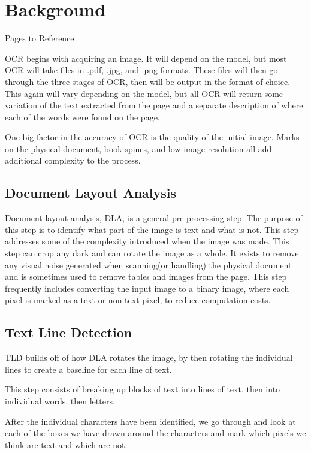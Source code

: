 \documentclass[sigplan,screen,nonacm]{acmart-tagged}
\begin{document}
\section{Background}
\label{sec:background}

Pages to Reference\cite{Raj:2022,Avyodri:2022,Thorat:2022}

OCR begins with acquiring an image. It will depend on the model, but most OCR will take files in .pdf, .jpg, and .png formats. These files will then go through the three stages of OCR, then will be output in the format of choice. This again will vary depending on the model, but all OCR will return some variation of the text extracted from the page and a separate description of where each of the words were found on the page.

One big factor in the accuracy of OCR is the quality of the initial image. Marks on the physical document, book spines, and low image resolution all add additional complexity to the process. 

\subsection{Document Layout Analysis}
\label{DLA}

Document layout analysis, DLA, is a general pre-processing step. The purpose of this step is to identify what part of the image is text and what is not. This step addresses some of the complexity introduced when the image was made. This step can crop any dark and can rotate the image as a whole. It exists to remove any visual noise generated when scanning(or handling) the physical document and is sometimes used to remove tables and images from the page. This step frequently includes converting the input image to a binary image, where each pixel is marked as a text or non-text pixel, to reduce computation costs.

\subsection{Text Line Detection}
\label{TLD}

TLD builds off of how DLA rotates the image, by then rotating the individual lines to create a baseline for each line of text. 

This step consists of breaking up blocks of text into lines of text, then into individual words, then letters.



After the individual characters have been identified, we go through and look at each of the boxes we have drawn around the characters and mark which pixels we think are text and which are not.
\end{document}
